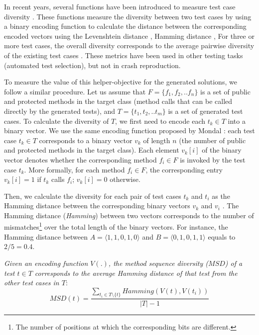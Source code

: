 In recent years, several functions have been introduced to measure test case diversity \cite{mondal2015}. These functions measure the diversity between two test cases by using a binary encoding function to calculate the distance between the corresponding encoded vectors using the Levenshtein distance \cite{Levenshtein1966}, Hamming distance \cite{Hamming1950}, \etc
For three or more test cases, the overall diversity corresponds to the average pairwise diversity of the existing test cases \cite{mondal2015}. These metrics have been used in other testing tasks (\eg automated test selection), but not in crash reproduction. 


To measure the value of this helper-objective for the generated solutions, we follow a similar procedure. Let us assume that $F=\{f_1, f_2, ..f_n\}$ is a set of public and protected methods in the target class (\ie method calls that can be called directly by the generated tests), and $T=\{t_1, t_2, ..t_m\}$ is a set of generated test cases.
To calculate the diversity of $T$, we first need to encode each $t_k \in T$ into a binary vector. We use the same encoding function proposed by Mondal \etal \cite{mondal2015}: each test case $t_k \in T$ corresponds to a binary vector $v_k$ of length  $n$ (\ie the number of public and protected methods in the target class). Each element $v_k[i]$ of the binary vector denotes whether the corresponding method $f_i\in F$ is invoked by the test case $t_k$. More formally, for each method $f_i \in F$,  the corresponding entry $v_k[i]=1$ if $t_k$ calls $f_i$;  $v_k[i]=0$ otherwise.

Then, we calculate the diversity for each pair of test cases $t_k$ and $t_i$ as the Hamming distance between the corresponding binary vectors  $v_k$ and $v_i$  \cite{Hamming1950}. 
The Hamming distance (\textit{Hamming}) between two vectors corresponds to the number of mismatches\footnote{The number of positions at which the corresponding bits are different.} over the total length of the binary vectors. For instance, the Hamming distance between $A=\langle1,1,0,1,0\rangle$ and $B=\langle0,1,0,1,1\rangle$ equals to $2/5= 0.4$. 

\begin{definition}
\textit{Given an encoding function $V(.)$, the method sequence diversity ($MSD$) of a test $t \in T$ corresponds to the average Hamming distance of that test from the other test cases in $T$}:
\begin{equation}
MSD(t)= \frac{\sum_{t_i \in T \setminus \{t\}} Hamming(V(t),V(t_i))}{|T| - 1}
\end{equation}
\end{definition}

